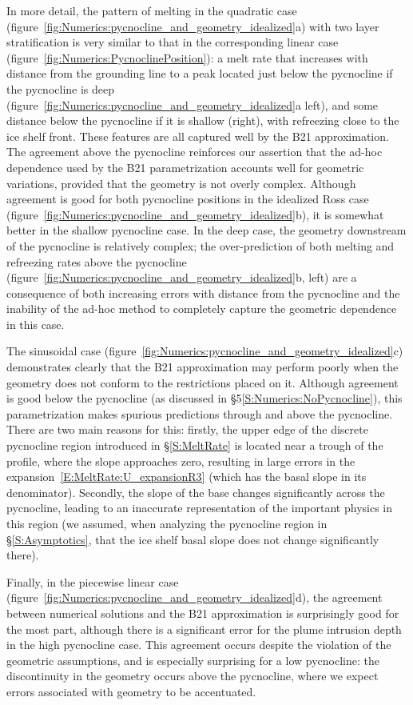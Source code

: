 \documentclass[openacc]{rsproca_new}%
\begin{document}
In more detail, the pattern of melting in the quadratic case (figure~\ref{fig:Numerics:pycnocline_and_geometry_idealized}a) with two layer stratification is very similar to that in the corresponding linear case (figure~\ref{fig:Numerics:PycnoclinePosition}): a melt rate that increases with distance from the grounding line to a peak located just below the pycnocline if the pycnocline is deep (figure~\ref{fig:Numerics:pycnocline_and_geometry_idealized}a left), and some distance below the pycnocline if it is shallow (right), with refreezing close to the ice shelf front. These features are all captured well by the B21 approximation. The agreement above the pycnocline reinforces our assertion that the ad-hoc dependence used by the B21 parametrization accounts well for geometric variations, provided that the geometry is not overly complex. Although agreement is good for both pycnocline positions in the idealized Ross case (figure~\ref{fig:Numerics:pycnocline_and_geometry_idealized}b), it is somewhat better in the shallow pycnocline case. In the deep case, the geometry downstream of the pycnocline is relatively complex; the over-prediction of both melting and refreezing rates above the pycnocline (figure~\ref{fig:Numerics:pycnocline_and_geometry_idealized}b, left) are a consequence of both increasing errors with distance from the pycnocline and the inability of the ad-hoc method to completely capture the geometric dependence in this case. 

The sinusoidal case (figure~\ref{fig:Numerics:pycnocline_and_geometry_idealized}c) demonstrates clearly that the B21 approximation may perform poorly when the geometry does not conform to the restrictions placed on it. Although agreement is good below the pycnocline (as discussed in \S5\ref{S:Numerics:NoPycnocline}), this parametrization makes spurious predictions through and above the pycnocline. There are two main reasons for this: firstly, the upper edge of the discrete pycnocline region introduced in \S\ref{S:MeltRate} is located near a trough of the profile, where the slope approaches zero, resulting in large errors in the expansion~\eqref{E:MeltRate:U_expansionR3} (which has the basal slope in its denominator).  Secondly, the slope of the base changes significantly across the pycnocline, leading to an inaccurate representation of the important physics in this region (we assumed, when analyzing the pycnocline region in \S\ref{S:Asymptotics}, that the ice shelf basal slope does not change significantly there).

Finally, in the piecewise linear case (figure~\ref{fig:Numerics:pycnocline_and_geometry_idealized}d), the agreement between numerical solutions and the B21 approximation is surprisingly good for the most part, although there is a significant error for the plume intrusion depth in the high pycnocline case. This agreement occurs despite the violation of the geometric assumptions, and is especially surprising for a low pycnocline: the discontinuity in the geometry occurs above the pycnocline, where we expect errors associated with geometry to be accentuated. 
\end{document}
